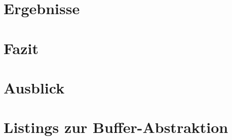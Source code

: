 \documentclass[m,twoside,intern,palatino]{cgBA}
\begin{document}
\section{Ergebnisse}

	
	
\section{Fazit}

	

\section{Ausblick}
	\label{sec:ausblick}
	


\cite{Stam99stablefluids}
\cite{Stam03realtimefluid}
\cite{Bridson2007FluidSimCourseNotes}
\cite{Muller2003}
\cite{Goswami2010}
\cite{Green2009FluidRenderingCurvatureFlow}
\cite{Peschel2009}
\cite{Steil2007}
\cite{Eberly2004}
\cite{Grand2008}
\cite{Harris2007}
	

	
	
	
\appendix
\section{Listings zur Buffer-Abstraktion}
	\label{append:bufferListings}
	
\clearpage




\end{document}
